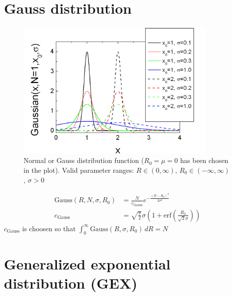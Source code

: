 
\clearpage
\section{Gauss distribution}

\begin{figure}[htb]
\begin{center}
\includegraphics[width=0.873\textwidth,height=0.653\textwidth]{GaussSD.png}
\end{center}
\caption{Normal or Gauss distribution function ($R_0=\mu=0$ has
been chosen in the plot). Valid parameter ranges: $R \in
(0,\infty)$, $R_0 \in (-\infty,\infty)$, $\sigma>0$}
\label{NormalDistr}
\end{figure}

\begin{subequations}
\begin{align}
\text{Gauss}(R,N,\sigma,R_0)&= \frac{N}{c_\text{Gauss}}
e^{-\frac{\left(R-R_0\right)^2}{2\sigma^2}}
\label{eq:GaussDistribution} \\
c_\text{Gauss} &=\sqrt{\frac{\pi}{2}}\sigma\left(1 +
\text{erf}\left(\frac{R_0}{\sqrt{2}\sigma}\right) \right)
\end{align}
\end{subequations}
$c_\text{Gauss}$ is choosen so that $\int_0^\infty\!
\text{Gauss}(R,\sigma,R_0)\,dR = N$


\clearpage
\section{Generalized exponential distribution (GEX)}

